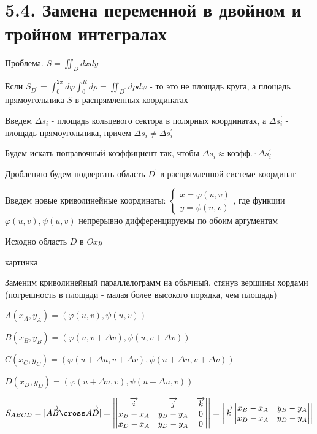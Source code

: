 \documentclass[12pt]{article}
\begin{document}
    \section{5.4. Замена переменной в двойном и тройном интегралах}

    Проблема. $S = \iint_D dxdy$

    Если $S_{D^\prime} = \int_0^{2\pi} d\varphi \int_0^R d\rho = \iint_{D^\prime} d\rho d\varphi$ - то это не площадь круга, а площадь прямоугольника $S$ в распрямленных координатах

    Введем $\Delta s_i$ - площадь кольцевого сектора в полярных координатах, а $\Delta s^\prime_i$ - площадь прямоугольника, причем $\Delta s_i \neq \Delta s_i^\prime$

    \Nota Будем искать поправочный коэффициент так, чтобы $\Delta s_i \approx \text{коэфф.} \cdot \Delta s_i^\prime$

    Дроблению будем подвергать область $D^\prime$ в распрямленной системе координат

    Введем новые криволинейные координаты: $\begin{cases}
                                                x = \varphi(u, v) \\ y = \psi(u, v)
    \end{cases}$,
    где функции $\varphi(u, v), \psi(u, v)$ непрерывно дифференцируемы по обоим аргументам

    Исходно область $D$ в $Oxy$

    картинка

    Заменим криволинейный параллелограмм на обычный, стянув вершины хордами (погрешность в площади - малая более высокого порядка, чем площадь)

    $A(x_A, y_A) = (\varphi(u, v), \psi(u, v))$

    $B(x_B, y_B) = (\varphi(u, v+\Delta v), \psi(u, v+\Delta v))$

    $C(x_C, y_C) = (\varphi(u + \Delta u, v+\Delta v), \psi(u + \Delta u, v+\Delta v))$

    $D(x_D, y_D) = (\varphi(u + \Delta u, v), \psi(u + \Delta u, v))$

    $S_{ABCD} = |\overrightarrow{AB} \cross \overrightarrow{AD}| = \left|
    \begin{vmatrix}
        \overrightarrow{i} & \overrightarrow{j} & \overrightarrow{k} \\
        x_B - x_A          & y_B - y_A          & 0                  \\
        x_D - x_A          & y_D - y_A          & 0
    \end{vmatrix}\right| = \left| \overrightarrow{k}
    \begin{vmatrix}
        x_B - x_A & y_B - y_A \\
        x_D - x_A & y_D - y_A
    \end{vmatrix}\right|$
\end{document}
